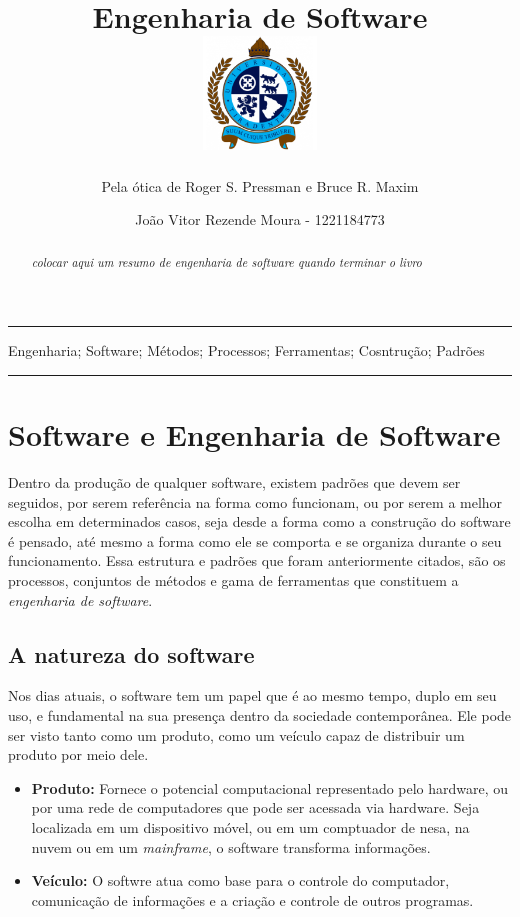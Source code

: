 \documentclass[12pt, a4paper]{paper}
\title{Engenharia de Software \\
  \hfill\includegraphics[height=3cm]{images/universidade.png}
  \vspace{-3cm}
}
\subtitle{Pela ótica de Roger S. Pressman e Bruce R. Maxim}
\author{João Vitor Rezende Moura - 1221184773}
\begin{document}

\maketitle

\hrule
  \begin{abstract}
  \textit{colocar aqui um resumo de engenharia de software quando terminar o livro}
  \end{abstract}

  \begin{keywords}Engenharia; Software; Métodos; Processos; Ferramentas; Cosntrução; Padrões\end{keywords}
\hrule

\section{Software e Engenharia de Software}
Dentro da produção de qualquer software, existem padrões que devem ser seguidos, por serem referência na forma como funcionam, ou por serem a melhor escolha em determinados casos, seja desde a forma como a construção do software é pensado, até mesmo a forma como ele se comporta e se organiza durante o seu funcionamento. Essa estrutura e padrões que foram anteriormente citados, são os processos, conjuntos de métodos e gama de ferramentas que constituem a \textit{engenharia de software}.

\subsection{A natureza do software}
Nos dias atuais, o software tem um papel que é ao mesmo tempo, duplo em seu uso, e fundamental na sua presença dentro da sociedade contemporânea. Ele pode ser visto tanto como um produto, como um veículo capaz de distribuir um produto por meio dele.

\begin{itemize} 
  \item \textbf{Produto: } Fornece o potencial computacional representado pelo hardware, ou por uma rede de computadores que pode ser acessada via hardware. Seja localizada em um dispositivo móvel, ou em um comptuador de nesa, na nuvem ou em um \textit{mainframe}, o software transforma informações.
  
  \item \textbf{Veículo: } O softwre atua como base para o controle do computador, comunicação de informações e a criação e controle de outros programas.
\end{itemize}
\end{document}

